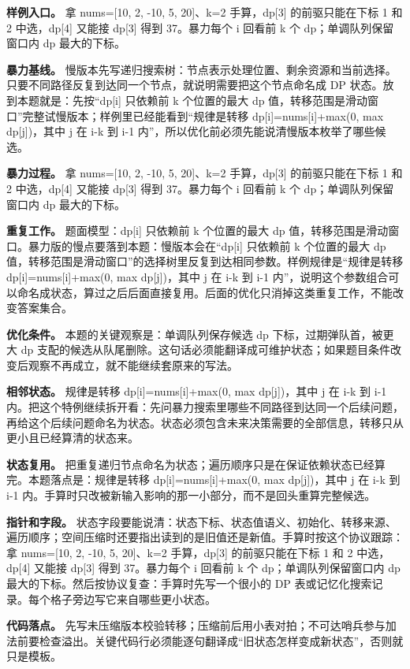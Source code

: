 \textbf{样例入口。} 拿 nums=[10, 2, -10, 5, 20]、k=2 手算，dp[3] 的前驱只能在下标 1 和 2 中选，dp[4] 又能接 dp[3] 得到 37。暴力每个 i 回看前 k 个 dp；单调队列保留窗口内 dp 最大的下标。

\textbf{暴力基线。} 慢版本先写递归搜索树：节点表示处理位置、剩余资源和当前选择。只要不同路径反复到达同一个节点，就说明需要把这个节点命名成 DP 状态。放到本题就是：先按“dp[i] 只依赖前 k 个位置的最大 dp 值，转移范围是滑动窗口”完整试慢版本；样例里已经能看到“规律是转移 dp[i]=nums[i]+max(0, max dp[j])，其中 j 在 i-k 到 i-1 内”，所以优化前必须先能说清慢版本枚举了哪些候选。

\textbf{暴力过程。} 拿 nums=[10, 2, -10, 5, 20]、k=2 手算，dp[3] 的前驱只能在下标 1 和 2 中选，dp[4] 又能接 dp[3] 得到 37。暴力每个 i 回看前 k 个 dp；单调队列保留窗口内 dp 最大的下标。

\textbf{重复工作。} 题面模型：dp[i] 只依赖前 k 个位置的最大 dp 值，转移范围是滑动窗口。暴力版的慢点要落到本题：慢版本会在“dp[i] 只依赖前 k 个位置的最大 dp 值，转移范围是滑动窗口”的选择树里反复到达相同参数。样例规律是“规律是转移 dp[i]=nums[i]+max(0, max dp[j])，其中 j 在 i-k 到 i-1 内”，说明这个参数组合可以命名成状态，算过之后后面直接复用。后面的优化只消掉这类重复工作，不能改变答案集合。

\textbf{优化条件。} 本题的关键观察是：单调队列保存候选 dp 下标，过期弹队首，被更大 dp 支配的候选从队尾删除。这句话必须能翻译成可维护状态；如果题目条件改变后观察不再成立，就不能继续套原来的写法。

\textbf{相邻状态。} 规律是转移 dp[i]=nums[i]+max(0, max dp[j])，其中 j 在 i-k 到 i-1 内。把这个特例继续拆开看：先问暴力搜索里哪些不同路径到达同一个后续问题，再给这个后续问题命名为状态。状态必须包含未来决策需要的全部信息，转移只从更小且已经算清的状态来。

\textbf{状态复用。} 把重复递归节点命名为状态；遍历顺序只是在保证依赖状态已经算完。本题落点是：规律是转移 dp[i]=nums[i]+max(0, max dp[j])，其中 j 在 i-k 到 i-1 内。手算时只改被新输入影响的那一小部分，而不是回头重算完整候选。

\textbf{指针和字段。} 状态字段要能说清：状态下标、状态值语义、初始化、转移来源、遍历顺序；空间压缩时还要指出读到的是旧值还是新值。手算时按这个协议跟踪：拿 nums=[10, 2, -10, 5, 20]、k=2 手算，dp[3] 的前驱只能在下标 1 和 2 中选，dp[4] 又能接 dp[3] 得到 37。暴力每个 i 回看前 k 个 dp；单调队列保留窗口内 dp 最大的下标。然后按协议复查：手算时先写一个很小的 DP 表或记忆化搜索记录。每个格子旁边写它来自哪些更小状态。

\textbf{代码落点。} 先写未压缩版本校验转移；压缩前后用小表对拍；不可达哨兵参与加法前要检查溢出。关键代码行必须能逐句翻译成“旧状态怎样变成新状态”，否则就只是模板。

